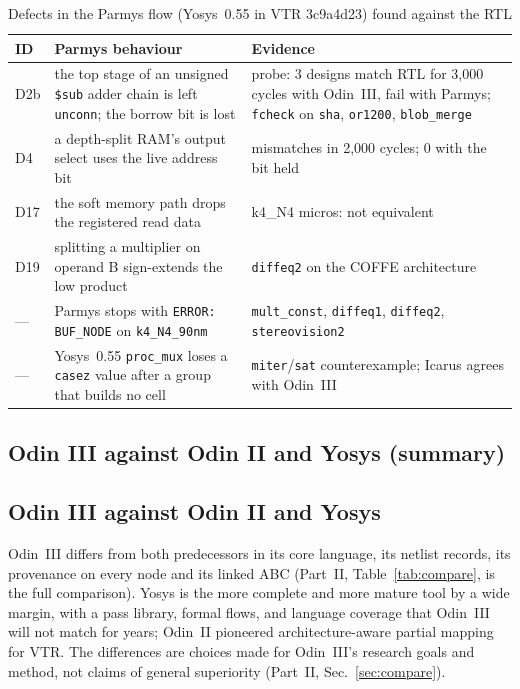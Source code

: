 \documentclass[conference]{IEEEtran}
\newcommand{\code}[1]{\texttt{#1}}
\begin{document}
\begin{table}[t]
\caption{Defects in the Parmys flow (Yosys~0.55 in VTR 3c9a4d23) found against the RTL}
\label{tab:parmys-bugs}
\centering
\footnotesize
\begin{tabular}{@{}>{\raggedright\arraybackslash}p{}%
  >{\raggedright\arraybackslash}p{}%
  >{\raggedright\arraybackslash}p{}@{}}
\toprule
ID & Parmys behaviour & Evidence \\
\midrule
D2b & the top stage of an unsigned \code{\$sub} adder chain is left \code{unconn}; the borrow bit is lost & probe: 3 designs match RTL for 3,000 cycles with Odin~III, fail with Parmys; \code{fcheck} on \code{sha}, \code{or1200}, \code{blob\_merge} \\
D4 & a depth-split RAM's output select uses the live address bit & 468 mismatches in 2,000 cycles; 0 with the bit held \\
D17 & the soft memory path drops the registered read data & k4\_N4 micros: not equivalent \\
D19 & splitting a multiplier on operand B sign-extends the low product & \code{diffeq2} on the COFFE architecture \\
--- & Parmys stops with \code{ERROR: BUF\_NODE} on \code{k4\_N4\_90nm} & \code{mult\_const}, \code{diffeq1}, \code{diffeq2}, \code{stereovision2} \\
--- & Yosys~0.55 \code{proc\_mux} loses a \code{casez} value after a group that builds no cell & \code{miter}/\code{sat} counterexample; Icarus agrees with Odin~III \\
\bottomrule
\end{tabular}
\end{table}

\subsection{Odin III against Odin II and Yosys (summary)}

\subsection{Odin III against Odin II and Yosys}
\label{sec:compare-summary}

Odin~III differs from both predecessors in its core language, its netlist records, its provenance on every node and its linked ABC (Part~II, Table~\ref{tab:compare}, is the full comparison). Yosys is the more complete and more mature tool by a wide margin, with a pass library, formal flows, and language coverage that Odin~III will not match for years; Odin~II pioneered architecture-aware partial mapping for VTR. The differences are choices made for Odin~III's research goals and method, not claims of general superiority (Part~II, Sec.~\ref{sec:compare}).
\end{document}
